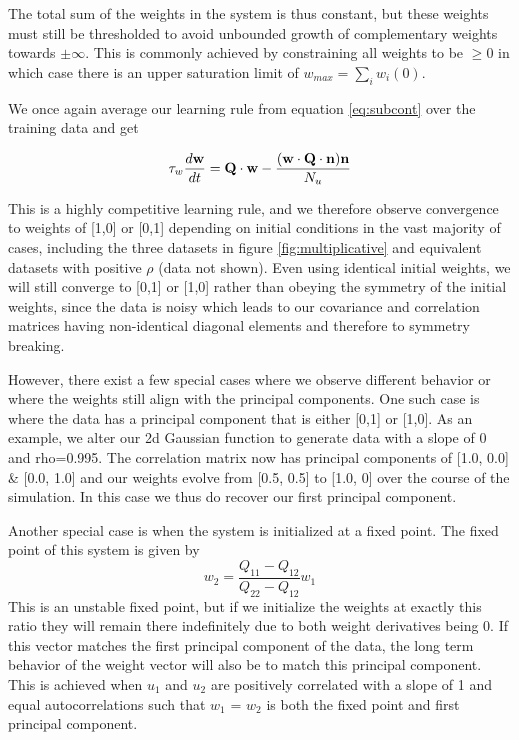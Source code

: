 \documentclass{article}
\begin{document}
The total sum of the weights in the system is thus constant, but these weights must still be thresholded to avoid unbounded growth of complementary weights towards $\pm \infty$. This is commonly achieved by constraining all weights to be $\geq 0$ in which case there is an upper saturation limit of $w_{max} = \sum_i{w_i(0)}$.

We once again average our learning rule from equation \ref{eq:subcont} over the training data and get

\begin{equation}\label{eq:subavg}
\tau_w \dfrac{d\bf{w}}{dt} = {\bf Q \cdot w} - \dfrac{({\bf w \cdot Q \cdot n}) {\bf n} }{N_u}
\end{equation}

This is a highly competitive learning rule, and we therefore observe convergence to weights of [1,0] or [0,1] depending on initial conditions in the vast majority of cases, including the three datasets in figure \ref{fig:multiplicative} and equivalent datasets with positive $\rho$ (data not shown).
Even using identical initial weights, we will still converge to [0,1] or [1,0] rather than obeying the symmetry of the initial weights, since the data is noisy which leads to our covariance and correlation matrices having non-identical diagonal elements and therefore to symmetry breaking. 

However, there exist a few special cases where we observe different behavior or where the weights still align with the principal components. One such case is where the data has a principal component that is either [0,1] or [1,0]. As an example, we alter our 2d Gaussian function to generate data with a slope of 0 and rho=0.995. The correlation matrix now has principal components of [1.0, 0.0] \& [0.0, 1.0] and our weights evolve from [0.5, 0.5] to [1.0, 0] over the course of the simulation. In this case we thus do recover our first principal component.

Another special case is when the system is initialized at a fixed point. The fixed point of this system is given by
\begin{equation}
w_2 = \dfrac{Q_{11}-Q_{12}}{Q_{22}-Q_{12}}w_1
\end{equation}
This is an unstable fixed point, but if we initialize the weights at exactly this ratio they will remain there indefinitely due to both weight derivatives being 0. If this vector matches the first principal component of the data, the long term behavior of the weight vector will also be to match this principal component. This is achieved when $u_1$ and $u_2$ are positively correlated with a slope of 1 and equal autocorrelations such that $w_1$ = $w_2$ is both the fixed point and first principal component.
\end{document}
